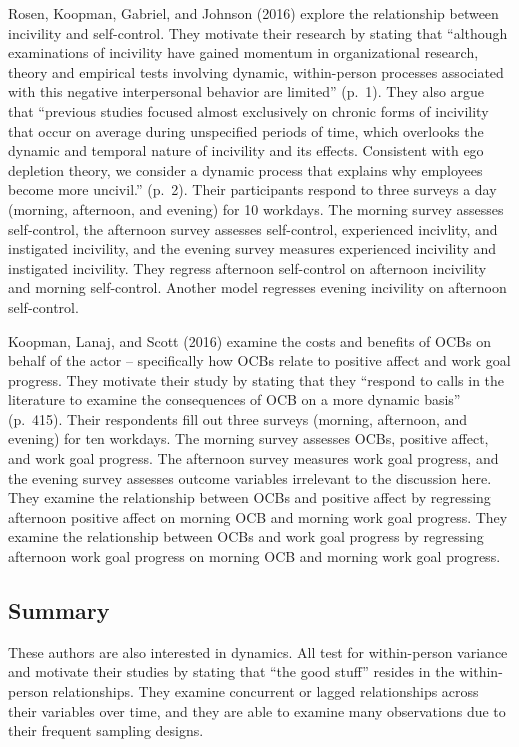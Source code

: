 \documentclass[english,,man]{apa6}
\theoremstyle{definition}
\theoremstyle{definition}
\theoremstyle{definition}
\theoremstyle{remark}
\begin{document}
Rosen, Koopman, Gabriel, and Johnson (2016) explore the relationship
between incivility and self-control. They motivate their research by
stating that \enquote{although examinations of incivility have gained
momentum in organizational research, theory and empirical tests
involving dynamic, within-person processes associated with this negative
interpersonal behavior are limited} (p.~1). They also argue that
\enquote{previous studies focused almost exclusively on chronic forms of
incivility that occur on average during unspecified periods of time,
which overlooks the dynamic and temporal nature of incivility and its
effects. Consistent with ego depletion theory, we consider a dynamic
process that explains why employees become more uncivil.} (p.~2). Their
participants respond to three surveys a day (morning, afternoon, and
evening) for 10 workdays. The morning survey assesses self-control, the
afternoon survey assesses self-control, experienced incivlity, and
instigated incivility, and the evening survey measures experienced
incivility and instigated incivility. They regress afternoon
self-control on afternoon incivility and morning self-control. Another
model regresses evening incivility on afternoon self-control.

Koopman, Lanaj, and Scott (2016) examine the costs and benefits of OCBs
on behalf of the actor -- specifically how OCBs relate to positive
affect and work goal progress. They motivate their study by stating that
they \enquote{respond to calls in the literature to examine the
consequences of OCB on a more dynamic basis} (p.~415). Their respondents
fill out three surveys (morning, afternoon, and evening) for ten
workdays. The morning survey assesses OCBs, positive affect, and work
goal progress. The afternoon survey measures work goal progress, and the
evening survey assesses outcome variables irrelevant to the discussion
here. They examine the relationship between OCBs and positive affect by
regressing afternoon positive affect on morning OCB and morning work
goal progress. They examine the relationship between OCBs and work goal
progress by regressing afternoon work goal progress on morning OCB and
morning work goal progress.

\hypertarget{summary-1}{%
\subsection{Summary}\label{summary-1}}

These authors are also interested in dynamics. All test for
within-person variance and motivate their studies by stating that
\enquote{the good stuff} resides in the within-person relationships.
They examine concurrent or lagged relationships across their variables
over time, and they are able to examine many observations due to their
frequent sampling designs.
\end{document}
